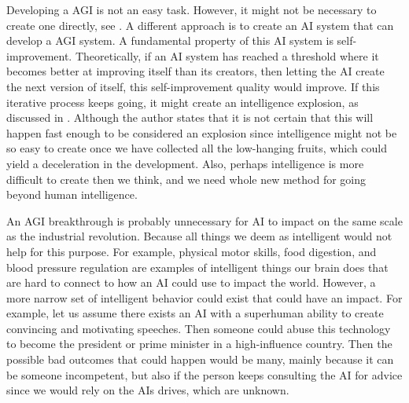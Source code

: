 \documentclass[12pt,A4]{report}
\theoremstyle{definition}
\begin{document}
Developing a AGI is not an easy task. However, it might not be necessary to create one directly, see \citet{Bostrom14}. A different approach is to create an AI system that can develop a AGI system. A fundamental property of this AI system is self-improvement. Theoretically, if an AI system has reached a threshold where it becomes better at improving itself than its creators, then letting the AI create the next version of itself, this self-improvement quality would improve. If this iterative process keeps going, it might create an intelligence explosion, as discussed in \citet{Yudkowsky13}. Although the author states that it is not certain that this will happen fast enough to be considered an explosion since intelligence might not be so easy to create once we have collected all the low-hanging fruits, which could yield a deceleration in the development. Also, perhaps intelligence is more difficult to create then we think, and we need whole new method for going beyond human intelligence.

An AGI breakthrough is probably unnecessary for AI to impact on the same scale as the industrial revolution. Because all things we deem as intelligent would not help for this purpose. For example, physical motor skills, food digestion, and blood pressure regulation are examples of intelligent things our brain does that are hard to connect to how an AI could use to impact the world. However, a more narrow set of intelligent behavior could exist that could have an impact. For example, let us assume there exists an AI with a superhuman ability to create convincing and motivating speeches. Then someone could abuse this technology to become the president or prime minister in a high-influence country. Then the possible bad outcomes that could happen would be many, mainly because it can be someone incompetent, but also if the person keeps consulting the AI for advice since we would rely on the AIs drives, which are unknown. 
\end{document}
